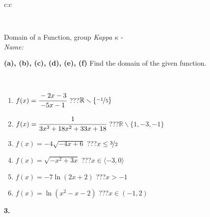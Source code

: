 \documentclass[10pt]{report}
\begin{document}
\begin{tabular}{c:c}
\begin{minipage}[c][104.5mm][t]{0.5\linewidth}
\begin{center}
\begin{minipage}{0.20\linewidth}
\begin{center}
\end{center}
\end{minipage}
\end{center}
\end{minipage}
\\ \hdashline
\begin{minipage}[c][104.5mm][t]{0.5\linewidth}
\begin{center}
\vspace{7mm}
{\huge Domain of a Function, group \textit{Kappa $\kappa$} -}\\[5mm]
\textit{Name:}\phantom{xxxxxxxxxxxxxxxxxxxxxxxxxxxxxxxxxxxxxxxxxxxxxxxxxxxxxxxxxxxxxxxxx}\\[5mm]
\begin{minipage}{0.95\linewidth}
\begin{center}
{
\textbf{(a), (b), (c), (d), (e), (f)} Find the domain of the given function. \\[1mm]
\phantom{x}
}
\end{center}
\end{minipage}
\\[4mm]
\begin{minipage}{0.79\linewidth}
\begin{center}
\begin{varwidth}{\linewidth}
\begin{enumerate}
\normalsizerrr
\item $f(x)=\cfrac{-2x-3}{-5x-1}$\quad \dotfill\; ???\;\dotfill \quad $ \mathbb{R} \smallsetminus\{\nicefrac{-1}{5} \}$
\item $f(x)=\cfrac{1}{3x^3+18x^2+33x+18}$\quad \dotfill\; ???\;\dotfill \quad $ \mathbb{R} \smallsetminus\{1,-3,-1 \}$
\item $f(x)=-4\sqrt{-4x+6}$\quad \dotfill\; ???\;\dotfill \quad $x\leq\nicefrac{3}{2}$
\item $f(x)=\sqrt{-x^2+3x}$\quad \dotfill\; ???\;\dotfill \quad $x\in\langle-3 , 0\rangle$
\item $f(x)=-7\ln{(2x+2)}$\quad \dotfill\; ???\;\dotfill \quad $x>-1$
\item $f(x)=\ln{(x^2-x-2)}$\quad \dotfill\; ???\;\dotfill \quad $x\in(-1 , 2)$
\end{enumerate}
\end{varwidth}
\end{center}
\end{minipage}
\begin{minipage}{0.20\linewidth}
\begin{center}
{\Huge\bfseries 3.} \\[2mm]

\end{center}
\end{minipage}
\end{center}
\end{minipage}
\end{tabular}
\end{document}
